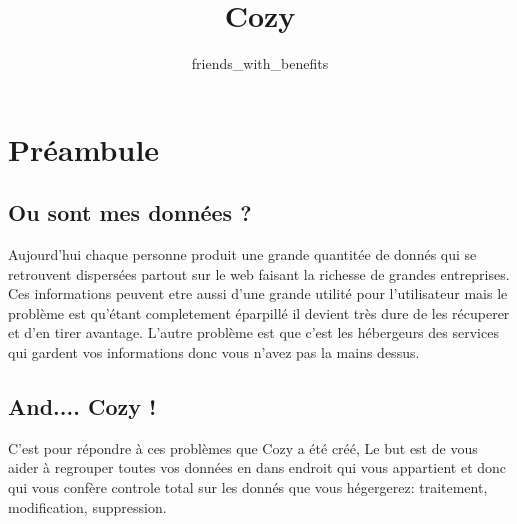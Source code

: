 \documentclass{42-fr}
\begin{document}
                           \title{Cozy}
                          \subtitle{friends\_with\_benefits}


\maketitle

\tableofcontents


\chapter{Préambule}


	\section{Ou sont mes donn\'ees ?}

		Aujourd'hui chaque personne produit une grande quantit\'ee de donn\'es
		qui se retrouvent dispers\'ees partout sur le web faisant la richesse de
		grandes entreprises. Ces informations peuvent etre aussi d'une grande
		utilit\'e pour l'utilisateur mais le probl\`eme est qu'\'etant completement
		\'eparpill\'e il devient tr\`es dure de les r\'ecuperer et d'en tirer
		avantage. L'autre probl\`eme est que c'est les h\'ebergeurs des services
		qui gardent vos informations donc vous n'avez pas la mains dessus.


	\section{And.... Cozy !}

		C'est pour r\'epondre \`a ces probl\`emes que Cozy a \'et\'e  cr\'e\'e,
		Le but est de vous aider \`a regrouper toutes vos donn\'ees en dans endroit
		qui vous appartient et donc qui vous conf\`ere controle total sur les
		donn\'es que vous h\'egergerez: traitement, modification, suppression.\\
\end{document}
